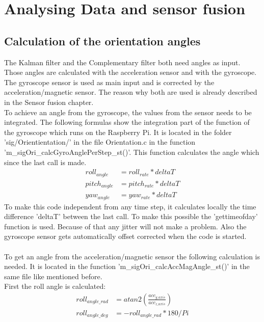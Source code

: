 

\chapter{Analysing Data and sensor fusion}
\label{sec:analysedata}

\section{Calculation of the orientation angles}
\label{sec:CalcAngle}
The Kalman filter and the Complementary filter both need angles as input. Those angles are calculated with the acceleration sensor and with the gyroscope. The gyroscope sensor is used as main input and is corrected by the acceleration/magnetic sensor. The reason why both are used is already described in the Sensor fusion chapter.\\
To achieve an angle from the gyroscope, the values from the sensor needs to be integrated. The following formulas show the integration part of the function of the gyroscope which runs on the Raspberry Pi. It is located in the folder 'sig/Orientientation/' in the file Orientation.c in the function 'm\_sigOri\_calcGyroAnglePerStep\_st()'. This function calculates the angle which since the last call is made.
\begin{align}
roll_{angle}&=roll_{rate}*deltaT\\
pitch_{angle}&=pitch_{rate}*deltaT\\
yaw_{angle}&=yaw_{rate}*deltaT
\end{align}
To make this code independent from any time step, it calculates locally the time difference 'deltaT' between the last call. To make this possible the 'gettimeofday' function is used. Because of that any jitter will not make a problem. Also the gyroscope sensor gets automatically offset corrected when the code is started.\\\\
To get an angle from the acceleration/magnetic sensor the following calculation is needed. It is located in the function 'm\_sigOri\_calcAccMagAngle\_st()' in the same file like mentioned before.\\
First the roll angle is calculated:
\begin{align}
roll_{angle\_rad}&=atan2\left(\frac{acc_{y\_axis}}{acc_{z\_axis}}\right)\\
		roll_{angle\_deg}&=-roll_{angle\_rad}*180/Pi
\end{align}

